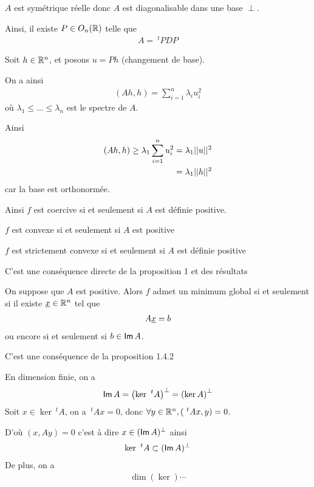\documentclass[french,a4paper,10pt]{article}
\begin{document}
	\begin{myproof}
		$A$ est symétrique réelle donc $A$ est diagonalisable dans une base $\perp$.
		
		Ainsi, il existe $P\in O_n(\mathbb{R})$ telle que
			\[\begin{aligned}
				A=~^tPDP
			\end{aligned}\]
			
		Soit $h\in\mathbb{R}^n$, et posons $u=Ph$ (changement de base).
		
		On a ainsi
		\[\begin{aligned}
			(Ah,h)=\sum_{i=1}^n\lambda_iu_i^2
		\end{aligned}\]
		où $\lambda_1\le\dots\le \lambda_n$ est le spectre de $A$.
		
		Ainsi 
			\[\begin{aligned}
				(Ah,h)\ge\lambda_1\sum_{i=1}^n u_i^2&=\lambda_1||u||^2\\
				&=\lambda_1||h||^2
			\end{aligned}\]
		car la base est orthonormée.
		
		Ainsi $f$ est coercive si et seulement si $A$ est définie positive.
	\end{myproof}
	
	\begin{oc-proposition}
		$f$ est convexe si et seulement si $A$ est positive
		
		$f$ est strictement convexe si et seulement si $A$ est définie positive
	\end{oc-proposition}
	\begin{myproof}
		C'est une conséquence directe de la proposition 1 et des résultats 
	\end{myproof}
	
	\begin{oc-proposition}
		On suppose que $A$ est positive. Alors $f$ admet un minimum global si et seulement si il existe $\underline{x}\in\mathbb{R}^n$ tel que 
			\[\begin{aligned}
				A\underline{x}=b
			\end{aligned}\]
		ou encore si et seulement si $b\in\operatorname{\mathsf{Im}} A$.
	\end{oc-proposition}
	
	\begin{myproof}
		C'est une conséquence de la proposition 1.4.2
	\end{myproof}
	
	\begin{oc-remark}
		En dimension finie, on a
			\[\begin{aligned}
				\operatorname{\mathsf{Im}} A=\left(\ker~^tA\right)^\perp=\left(\ker A\right)^\perp
			\end{aligned}\]
		Soit $x\in\ker~^tA$, on a $~^tAx=0$, donc $\forall y\in\mathbb{R}^n, \left(~^tAx,y\right)=0$.
		
		D'où $(x,Ay)=0$ c'est à dire $x\in(\operatorname{\mathsf{Im}} A)^\perp$ ainsi
			\[\begin{aligned}
				\ker~^tA\subset (\operatorname{\mathsf{Im}} A)^\perp
			\end{aligned}\]
		De plus, on a
			\[\begin{aligned}
				\dim(\ker)\cdots
			\end{aligned}\]
	\end{oc-remark}
	
\end{document}
